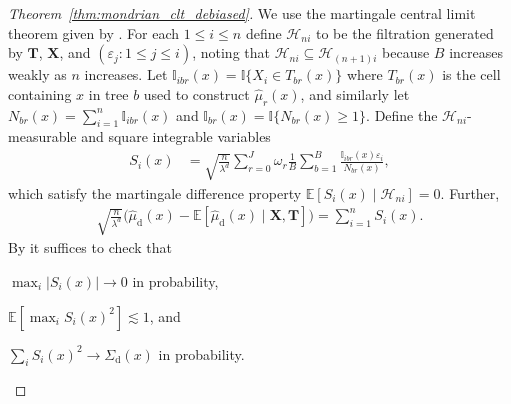 \documentclass[11pt,lof]{puthesis}
\newcommand{\E}{\ensuremath{\mathbb{E}}}
\newcommand{\I}{\ensuremath{\mathbb{I}}}
\newcommand{\rd}{\ensuremath{\mathrm{d}}}
\newcommand{\bX}{\ensuremath{\mathbf{X}}}
\newcommand{\bT}{\ensuremath{\mathbf{T}}}
\newcommand{\cH}{\ensuremath{\mathcal{H}}}
\theoremstyle{break}
\theoremstyle{proof}
\newtheorem{proof}{Proof}
\begin{document}
\begin{proof}[Theorem~\ref{thm:mondrian_clt_debiased}]

We use the martingale central limit theorem given by
\citet[Theorem~3.2]{hall1980martingale}.
For each $1 \leq i \leq n$ define
$\cH_{n i}$ to be the filtration
generated by $\bT$, $\bX$, and
$(\varepsilon_j : 1 \leq j \leq i)$,
noting that $\cH_{n i} \subseteq \cH_{(n+1)i}$
because $B$ increases weakly as $n$ increases.
Let $\I_{i b r}(x) = \I\{X_i \in T_{b r}(x)\}$
where $T_{b r}(x)$ is the cell containing $x$ in tree $b$
used to construct $\hat \mu_r(x)$,
and similarly let $N_{b r}(x) = \sum_{i=1}^n \I_{i b r}(x)$
and $\I_{b r}(x) = \I\{N_{b r}(x) \geq 1\}$.
Define the $\cH_{n i}$-measurable and square integrable
variables
%
\begin{align*}
S_i(x)
&=
\sqrt{\frac{n}{\lambda^d}}
\sum_{r=0}^{J}
\omega_r
\frac{1}{B} \sum_{b=1}^B
\frac{\I_{i b r}(x) \varepsilon_i} {N_{b r}(x)},
\end{align*}
%
which satisfy the martingale
difference property
$\E [ S_i(x) \mid \cH_{n i} ] = 0$.
Further,
%
\begin{align*}
\sqrt{\frac{n}{\lambda^d}}
\big(
\hat\mu_\rd(x)
- \E\left[
\hat\mu_\rd(x) \mid \bX, \bT
\right]
\big)
= \sum_{i=1}^n S_i(x).
\end{align*}
%
By \citet[Theorem~3.2]{hall1980martingale}
it suffices to check that
%
\begin{inlineroman}
\item $\max_i |S_i(x)| \to 0$ in probability,%
\label{it:mondrian_app_hall_prob}
\item $\E\left[\max_i S_i(x)^2\right] \lesssim 1$, and%
\label{it:mondrian_app_hall_exp}
\item $\sum_i S_i(x)^2 \to \Sigma_\rd(x)$ in probability.
\label{it:mondrian_app_hall_var}
\end{inlineroman}


\end{proof}
\end{document}
